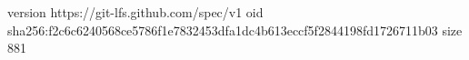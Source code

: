version https://git-lfs.github.com/spec/v1
oid sha256:f2c6c6240568ce5786f1e7832453dfa1dc4b613eccf5f2844198fd1726711b03
size 881
